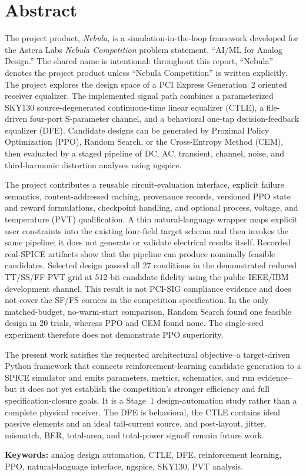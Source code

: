 \chapter*{Abstract}

The project product, \emph{Nebula}, is a simulation-in-the-loop framework
developed for the Astera Labs \emph{Nebula Competition} problem statement,
``AI/ML for Analog Design.'' The shared name is intentional: throughout this
report, ``Nebula'' denotes the project product unless ``Nebula Competition'' is
written explicitly. The project explores the design space of a
PCI Express Generation~2 oriented receiver equalizer. The implemented signal
path combines a parameterized SKY130 source-degenerated continuous-time linear
equalizer (CTLE), a file-driven four-port S-parameter channel, and a behavioral
one-tap decision-feedback equalizer (DFE). Candidate designs can be generated by
Proximal Policy Optimization (PPO), Random Search, or the Cross-Entropy Method
(CEM), then evaluated by a staged pipeline of DC, AC, transient, channel, noise,
and third-harmonic distortion analyses using ngspice.

The project contributes a reusable circuit-evaluation interface, explicit
failure semantics, content-addressed caching, provenance records, versioned PPO
state and reward formulations, checkpoint handling, and optional process,
voltage, and temperature (PVT) qualification. A thin natural-language wrapper
maps explicit user constraints into the existing four-field target schema and
then invokes the same pipeline; it does not generate or validate electrical
results itself. Recorded real-SPICE artifacts show
that the pipeline can produce nominally feasible candidates. Selected design
 passed all 27 conditions in the demonstrated reduced
TT/SS/FF PVT grid at 512-bit candidate fidelity using the public IEEE/IBM
development channel. This result is not PCI-SIG compliance evidence and does
not cover the SF/FS corners in the competition specification.
In the only matched-budget, no-warm-start comparison, Random Search found one
feasible design in 20 trials, whereas PPO and CEM found none. The single-seed
experiment therefore does not demonstrate PPO superiority.

The present work satisfies the requested architectural objective--a target-driven
Python framework that connects reinforcement-learning candidate generation to a
SPICE simulator and emits parameters, metrics, schematics, and run evidence--but
it does not yet establish the competition's stronger efficiency and full
specification-closure goals. It is a Stage~1 design-automation study rather than a complete
physical receiver. The DFE is behavioral, the CTLE contains ideal passive
elements and an ideal tail-current source, and post-layout, jitter, mismatch,
BER, total-area, and total-power signoff remain future work.

\textbf{Keywords:} analog design automation, CTLE, DFE, reinforcement learning,
PPO, natural-language interface, ngspice, SKY130, PVT analysis.
